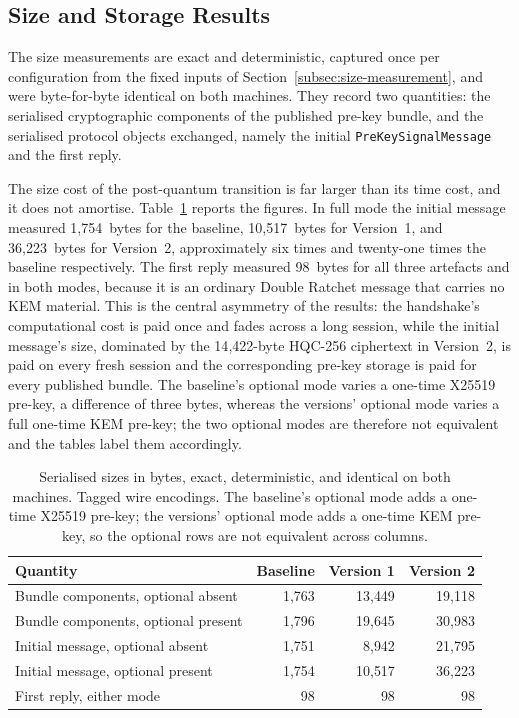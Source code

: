 \subsection{Size and Storage Results}
\label{subsec:size-results}

The size measurements are exact and deterministic, captured once per configuration from the fixed inputs of Section~\ref{subsec:size-measurement}, and were byte-for-byte identical on both machines. They record two quantities: the serialised cryptographic components of the published pre-key bundle, and the serialised protocol objects exchanged, namely the initial \texttt{PreKeySignalMessage} and the first reply.

The size cost of the post-quantum transition is far larger than its time cost, and it does not amortise. Table~\ref{tab:sizes} reports the figures. In full mode the initial message measured 1{,}754~bytes for the baseline, 10{,}517~bytes for Version~1, and 36{,}223~bytes for Version~2, approximately six times and twenty-one times the baseline respectively. The first reply measured 98~bytes for all three artefacts and in both modes, because it is an ordinary Double Ratchet message that carries no KEM material. This is the central asymmetry of the results: the handshake's computational cost is paid once and fades across a long session, while the initial message's size, dominated by the 14{,}422-byte HQC-256 ciphertext in Version~2, is paid on every fresh session and the corresponding pre-key storage is paid for every published bundle. The baseline's optional mode varies a one-time X25519 pre-key, a difference of three bytes, whereas the versions' optional mode varies a full one-time KEM pre-key; the two optional modes are therefore not equivalent and the tables label them accordingly.

\begin{table}[htbp]
\centering
\caption{Serialised sizes in bytes, exact, deterministic, and identical on both machines. Tagged wire encodings. The baseline's optional mode adds a one-time X25519 pre-key; the versions' optional mode adds a one-time KEM pre-key, so the optional rows are not equivalent across columns.}
\label{tab:sizes}
\small
\begin{tabular}{l rrr}
\hline
\textbf{Quantity} & \textbf{Baseline} & \textbf{Version 1} & \textbf{Version 2} \\
\hline
Bundle components, optional absent & 1{,}763 & 13{,}449 & 19{,}118 \\
Bundle components, optional present & 1{,}796 & 19{,}645 & 30{,}983 \\
Initial message, optional absent & 1{,}751 & 8{,}942 & 21{,}795 \\
Initial message, optional present & 1{,}754 & 10{,}517 & 36{,}223 \\
First reply, either mode & 98 & 98 & 98 \\
\hline
\end{tabular}
\end{table}

